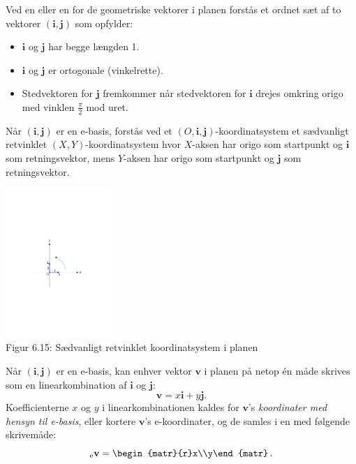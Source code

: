 \begin{definition}
Ved en  eller en  for de geometriske vektorer i planen forstås et ordnet sæt af to vektorer $(\mathbf i,\mathbf j)$ som opfylder:
\begin{itemize}
\item
$\mathbf i$ og $\mathbf j$ har begge længden 1.
\item
$\mathbf i$ og $\mathbf j$ er ortogonale (vinkelrette).
\item
Stedvektoren for $\mathbf j$ fremkommer når stedvektoren for $\mathbf i$ drejes omkring origo med vinklen $\frac \pi 2$ mod uret.
\end{itemize}
Når $(\mathbf i,\mathbf j)$ er en e-basis, forstås ved et $(O,\mathbf i,\mathbf j)$-koordinatsystem et sædvanligt retvinklet $(X,Y)$-koordinatsystem hvor $X$-aksen har origo som startpunkt og $\mathbf i$ som retningsvektor, mens $Y$-aksen har origo som startpunkt og $\mathbf j$ som retningsvektor.
\begin{center}
		\includegraphics[trim=6.5cm 11cm 5cm 10cm,width=0.30\textwidth,clip]{geometer/vektor9.pdf}				
		\\Figur 6.15: Sædvanligt retvinklet koordinatsystem i planen
\end{center}
\end{definition}

\begin{theorem}
Når $(\mathbf i,\mathbf j)$ er en e-basis, kan enhver vektor $\mathbf v$ i planen på netop én måde skrives som en linearkombination af $\mathbf i$ og $\mathbf j$:
$$\mathbf v=x\mathbf i+y\mathbf j.$$
Koefficienterne $x$ og $y$ i linearkombinationen kaldes for $\mathbf v$'s \textit{koordinater med hensyn til e-basis}, eller kortere $\mathbf v$'s e-koordinater, og de samles i en  med følgende skrivemåde:
$$_\mathrm e\mathbf v=
\begin{matr}{r}x\\y\end{matr}\,.
$$

\end{theorem}

